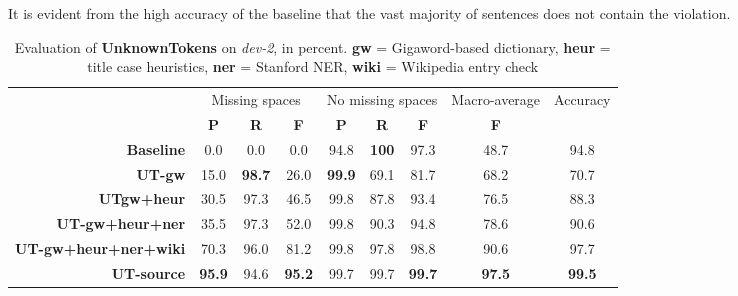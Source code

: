 \documentclass[a4paper,10pt]{scrartcl}
\theoremstyle{style}
\begin{document}
It is evident from the high accuracy of the baseline that the vast majority of sentences does not contain the violation.

\begin{table}
\begin{center}
\begin{tabular}{|r|c|c|c|c|c|c|c|c|}
\hline
& \multicolumn{3}{c|}{Missing spaces} & \multicolumn{3}{c|}{No missing spaces} & Macro-average & Accuracy\\
& \textbf{P} & \textbf{R} & \textbf{F} & \textbf{P} & \textbf{R} & \textbf{F} & \textbf{F} & \\
\hline
\textbf{Baseline} & 0.0 & 0.0 & 0.0 & 94.8 & \textbf{100} & 97.3 & 48.7 & 94.8\\
\hline
\textbf{UT-gw} & 15.0 & \textbf{98.7} & 26.0 & \textbf{99.9} & 69.1 & 81.7 & 68.2 & 70.7\\
\hline
\textbf{UTgw+heur} & 30.5 & 97.3 & 46.5 & 99.8 & 87.8 & 93.4 & 76.5 & 88.3\\
\hline
\textbf{UT-gw+heur+ner} & 35.5 & 97.3 & 52.0 & 99.8 & 90.3 & 94.8 & 78.6 & 90.6\\
\hline
\textbf{UT-gw+heur+ner+wiki} & 70.3 & 96.0 & 81.2 & 99.8 & 97.8 & 98.8 & 90.6 & 97.7\\
\hline
\textbf{UT-source} & \textbf{95.9} & 94.6 & \textbf{95.2} & 99.7 & 99.7 & \textbf{99.7} & \textbf{97.5} & \textbf{99.5}\\
\hline
\end{tabular}
\end{center}
\caption{Evaluation of \textbf{UnknownTokens} on \textit{dev-2}, in percent. \textbf{gw} = Gigaword-based dictionary, \textbf{heur} = title case heuristics, \textbf{ner} = Stanford NER, \textbf{wiki} = Wikipedia entry check}
\label{eval_unknowntokens}
\end{table}
\end{document}
